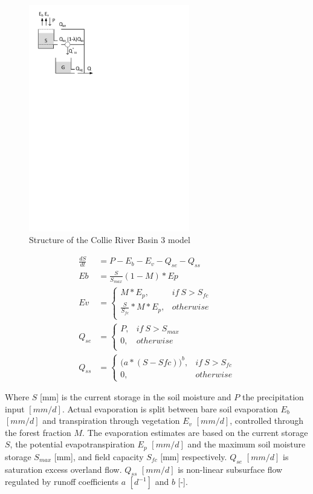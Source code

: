 { 																	%
\begin{figure}
\includegraphics[trim=1cm 20cm 9cm 1cm,width=7cm,keepaspectratio]{./files/11_schematic.pdf}
\caption{Structure of the Collie River Basin 3 model} \label{fig:11_schematic}
\end{figure}

\begin{align}
	\frac{dS}{dt} &= P -E_b - E_v -Q_{se}-Q_{ss} \\
	Eb &= \frac{S}{S_{max}}(1-M)*Ep\\
	Ev &= 
		\begin{cases}
			M*E_p, & if~S>S_{fc}\\
			\frac{S}{S_{fc}}*M*E_p, &otherwise\\
		\end{cases}\\
	Q_{se} &= 
		\begin{cases}
			P, & if~S>S_{max}\\
			0, & otherwise \\
		\end{cases}\\
	Q_{ss} &= 
		\begin{cases}
			\big(a*(S-S{fc})\big)^b, & if~S>S_{fc}\\
			0, & otherwise 
		\end{cases}
\end{align}
}
\vspace{1.5cm}

Where  $S$ [mm] is the current storage in the soil moisture and $P$ the precipitation input $[mm/d]$. Actual evaporation is split between bare soil evaporation $E_b$ $[mm/d]$ and transpiration through vegetation $E_v$ $[mm/d]$, controlled through the forest fraction $M$. The evaporation estimates are based on the current storage $S$, the potential evapotranspiration $E_p$ $[mm/d]$ and the maximum soil moisture storage $S_{max}$ [mm], and field capacity $S_{fc}$ [mm] respectively. $Q_{se}$ $[mm/d]$ is saturation excess overland flow.  $Q_{ss}$ $[mm/d]$ is non-linear subsurface flow regulated by runoff coefficients $a$ $[d^{-1}]$ and $b$ [-].

